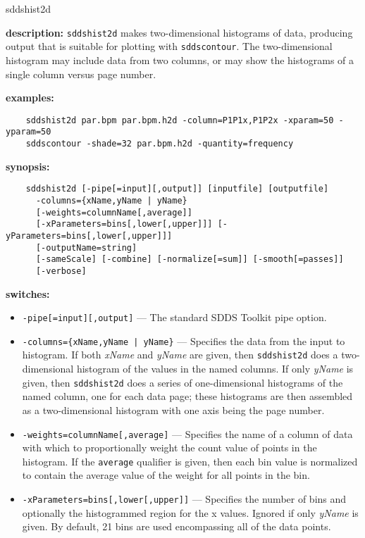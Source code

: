 \begin{sddsprog}{sddshist2d}
  \item {\bf description:} \verb|sddshist2d| makes two-dimensional histograms of data, producing
    output that is suitable for plotting with \verb|sddscontour|. The two-dimensional histogram
    may include data from two columns, or may show the histograms of a single column versus
    page number.
  \item {\bf examples:}
    \begin{verbatim}
    sddshist2d par.bpm par.bpm.h2d -column=P1P1x,P1P2x -xparam=50 -yparam=50
    sddscontour -shade=32 par.bpm.h2d -quantity=frequency
    \end{verbatim}
  \item {\bf synopsis:}
    \begin{verbatim}
    sddshist2d [-pipe[=input][,output]] [inputfile] [outputfile]
      -columns={xName,yName | yName}
      [-weights=columnName[,average]]
      [-xParameters=bins[,lower[,upper]]] [-yParameters=bins[,lower[,upper]]]
      [-outputName=string]
      [-sameScale] [-combine] [-normalize[=sum]] [-smooth[=passes]]
      [-verbose]
    \end{verbatim}
  \item {\bf switches:}
    \begin{itemize}
      \item \verb|-pipe[=input][,output]| --- The standard SDDS Toolkit pipe option.
      \item \verb!-columns={xName,yName | yName}! --- Specifies the data from the input to histogram. If both
        {\em xName} and {\em yName} are given, then \verb|sddshist2d| does a two-dimensional histogram of the values in
        the named columns. If only {\em yName} is given, then \verb|sddshist2d| does a series of one-dimensional histograms
        of the named column, one for each data page; these histograms are then assembled as a two-dimensional histogram
        with one axis being the page number.
      \item \verb|-weights=columnName[,average]| --- Specifies the name of a column of data with which to proportionally
        weight the count value of points in the histogram. If the \verb|average| qualifier is given, then each bin value
        is normalized to contain the average value of the weight for all points in the bin.
      \item \verb|-xParameters=bins[,lower[,upper]]| --- Specifies the number of bins and optionally the histogrammed region
        for the x values. Ignored if only {\em yName} is given. By default, 21 bins are used encompassing all of the data points.

\end{itemize}
\end{sddsprog}

